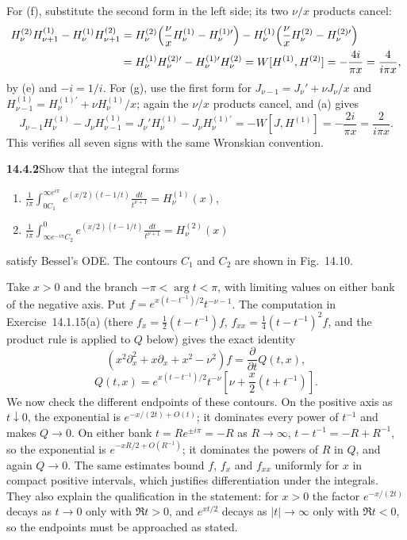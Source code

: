 For (f), substitute the second form in the left side; its two
$\nu/x$ products cancel:
\begin{align*}
H_\nu^{(2)}H_{\nu+1}^{(1)}-H_\nu^{(1)}H_{\nu+1}^{(2)}
&=H_\nu^{(2)}\Bigl(\frac\nu xH_\nu^{(1)}-H_\nu^{(1)\prime}\Bigr)
-H_\nu^{(1)}\Bigl(\frac\nu xH_\nu^{(2)}-H_\nu^{(2)\prime}\Bigr)\\
&=H_\nu^{(1)}H_\nu^{(2)\prime}-H_\nu^{(1)\prime}H_\nu^{(2)}
=W[H^{(1)},H^{(2)}]=-\frac{4i}{\pi x}
=\frac4{i\pi x},
\end{align*}
by (e) and $-i=1/i$. For (g), use the first form for
$J_{\nu-1}=J_\nu'+\nu J_\nu/x$ and
$H_{\nu-1}^{(1)}=H_\nu^{(1)\prime}+\nu H_\nu^{(1)}/x$; again the
$\nu/x$ products cancel, and (a) gives
\[
J_{\nu-1}H_\nu^{(1)}-J_\nu H_{\nu-1}^{(1)}
=J_\nu'H_\nu^{(1)}-J_\nu H_\nu^{(1)\prime}
=-W[J,H^{(1)}]
=-\frac{2i}{\pi x}=\frac2{i\pi x}.
\]
This verifies all seven signs with the same Wronskian convention.

\par\bigskip
\noindent\textbf{14.4.2}\quad Show that the integral forms
\begin{enumerate}
\item[(a)] $\displaystyle\frac{1}{i\pi}
\int_{0C_{1}}^{\infty e^{i\pi}}e^{(x/2)(t-1/t)}
\frac{dt}{t^{\nu+1}}=H_{\nu}^{(1)}(x)$,
\item[(b)] $\displaystyle\frac{1}{i\pi}
\int_{\infty e^{-i\pi}C_{2}}^{0}e^{(x/2)(t-1/t)}
\frac{dt}{t^{\nu+1}}=H_{\nu}^{(2)}(x)$
\end{enumerate}
satisfy Bessel's ODE. The contours $C_{1}$ and $C_{2}$ are shown in
Fig.~14.10.
\par{}
\solution
Take $x>0$ and the branch $-\pi<\arg t<\pi$, with limiting
values on either bank of the negative axis. Put
$f=e^{x(t-t^{-1})/2}t^{-\nu-1}$. The computation in
Exercise~14.1.15(a) (there $f_x=\frac12(t-t^{-1})f$,
$f_{xx}=\frac14(t-t^{-1})^2f$, and the product rule is applied to
$Q$ below) gives the exact identity
\[
(x^2\partial_x^2+x\partial_x+x^2-\nu^2)f
=\frac{\partial}{\partial t}Q(t,x),
\]
\[
Q(t,x)=e^{x(t-t^{-1})/2}t^{-\nu}
\left[\nu+\frac x2(t+t^{-1})\right].
\]
We now check the different endpoints of these contours.
On the positive axis as $t\downarrow0$, the exponential is
$e^{-x/(2t)+O(t)}$; it dominates every power of $t^{-1}$ and
makes $Q\to0$. On either bank $t=Re^{\pm i\pi}=-R$ as
$R\to\infty$, $t-t^{-1}=-R+R^{-1}$, so the exponential is
$e^{-xR/2+O(R^{-1})}$; it dominates the powers of $R$ in $Q$, and
again $Q\to0$. The same estimates bound $f$, $f_x$ and $f_{xx}$
uniformly for $x$ in compact positive intervals, which justifies
differentiation under the integrals. They also explain the
qualification in the statement: for $x>0$ the factor
$e^{-x/(2t)}$ decays as $t\to0$ only with $\Re t>0$, and $e^{xt/2}$
decays as $|t|\to\infty$ only with $\Re t<0$, so the endpoints must
be approached as stated.

